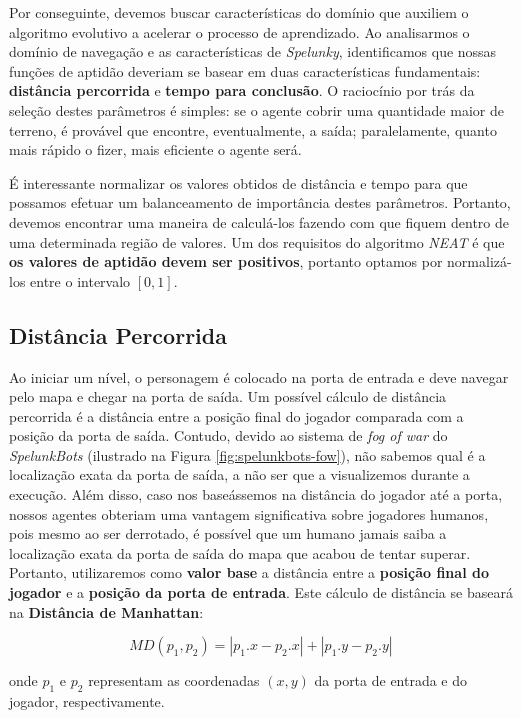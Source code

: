 Por conseguinte, devemos buscar características do domínio que auxiliem o
algoritmo evolutivo a acelerar o processo de aprendizado. Ao analisarmos o
domínio de navegação e as características de \textit{Spelunky}, identificamos
que nossas funções de aptidão deveriam se basear em duas características
fundamentais: \textbf{distância percorrida} e \textbf{tempo para conclusão}. O
raciocínio por trás da seleção destes parâmetros é simples: se o agente cobrir
uma quantidade maior de terreno, é provável que encontre, eventualmente, a
saída; paralelamente, quanto mais rápido o fizer, mais eficiente o agente será.

É interessante normalizar os valores obtidos de distância e tempo para que
possamos efetuar um balanceamento de importância destes parâmetros. Portanto,
devemos encontrar uma maneira de calculá-los fazendo com que fiquem dentro de
uma determinada região de valores. Um dos requisitos do algoritmo \textit{NEAT}
é que \textbf{os valores de aptidão devem ser positivos}, portanto optamos por
normalizá-los entre o intervalo $[0, 1]$.

\subsection{Distância Percorrida}
Ao iniciar um nível, o personagem é colocado na porta de entrada e deve navegar
pelo mapa e chegar na porta de saída. Um possível cálculo de distância
percorrida é a distância entre a posição final do jogador comparada com a
posição da porta de saída. Contudo, devido ao sistema de \textit{fog of war} do
\textit{SpelunkBots} (ilustrado na Figura \ref{fig:spelunkbots-fow}), não
sabemos qual é a localização exata da porta de saída, a não ser que a
visualizemos durante a execução. Além disso, caso nos baseássemos na distância
do jogador até a porta, nossos agentes obteriam uma vantagem significativa sobre
jogadores humanos, pois mesmo ao ser derrotado, é possível que um humano jamais
saiba a localização exata da porta de saída do mapa que acabou de tentar
superar. Portanto, utilizaremos como \textbf{valor base} a distância entre a
\textbf{posição final do jogador} e a \textbf{posição da porta de entrada}. Este
cálculo de distância se baseará na \textbf{Distância de Manhattan}:

\begin{equation}
	\label{eq:manhattan-distance}
	MD(p_1,p_2) = |p_1.x - p_2.x| + |p_1.y - p_2.y|
\end{equation}

onde $p_1$ e $p_2$ representam as coordenadas $(x,y)$ da porta de entrada e do
jogador, respectivamente. 

